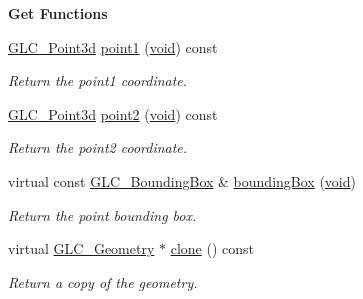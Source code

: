 \begin{Indent}{\bf Get Functions}\par
\begin{DoxyCompactItemize}
\item 
\hyperlink{glc__vector3d_8h_a4e13a9bbc7ab3d34de7e98b41836772c}{G\-L\-C\-\_\-\-Point3d} \hyperlink{class_g_l_c___line_a67189d57edafbe5d0d773dc3d404fc80}{point1} (\hyperlink{group___u_a_v_objects_plugin_ga444cf2ff3f0ecbe028adce838d373f5c}{void}) const 
\begin{DoxyCompactList}\small\item\em Return the point1 coordinate. \end{DoxyCompactList}\item 
\hyperlink{glc__vector3d_8h_a4e13a9bbc7ab3d34de7e98b41836772c}{G\-L\-C\-\_\-\-Point3d} \hyperlink{class_g_l_c___line_a93be800f2f572d37de4e140e3cc04a81}{point2} (\hyperlink{group___u_a_v_objects_plugin_ga444cf2ff3f0ecbe028adce838d373f5c}{void}) const 
\begin{DoxyCompactList}\small\item\em Return the point2 coordinate. \end{DoxyCompactList}\item 
virtual const \hyperlink{class_g_l_c___bounding_box}{G\-L\-C\-\_\-\-Bounding\-Box} \& \hyperlink{class_g_l_c___line_a3a1c93919c68f9614a1e46717fa50b83}{bounding\-Box} (\hyperlink{group___u_a_v_objects_plugin_ga444cf2ff3f0ecbe028adce838d373f5c}{void})
\begin{DoxyCompactList}\small\item\em Return the point bounding box. \end{DoxyCompactList}\item 
virtual \hyperlink{class_g_l_c___geometry}{G\-L\-C\-\_\-\-Geometry} $\ast$ \hyperlink{class_g_l_c___line_a0e034bdd855f170a6ba5e27b3192eab2}{clone} () const 
\begin{DoxyCompactList}\small\item\em Return a copy of the geometry. \end{DoxyCompactList}\end{DoxyCompactItemize}
\end{Indent}
